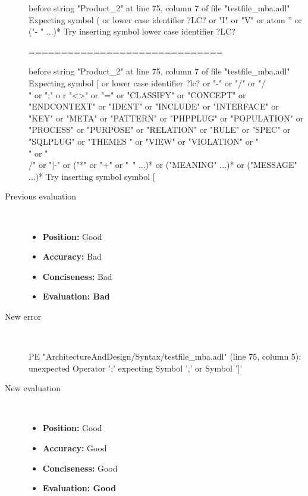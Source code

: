 \begin{description}
\begin{haskell}
before string "Product_2" at line 75, column 7 of file "testfile_mba.adl"
Expecting symbol ( or lower case identifier ?LC? or "I" or "V" or atom '' or ("-
" ...)*
Try inserting symbol lower case identifier ?LC?

==============================

before string "Product_2" at line 75, column 7 of file "testfile_mba.adl"
Expecting symbol [ or lower case identifier ?lc? or "-" or "/" or "/\\" or ";" o
r "<>" or "=" or "CLASSIFY" or "CONCEPT" or "ENDCONTEXT" or "IDENT" or "INCLUDE"
 or "INTERFACE" or "KEY" or "META" or "PATTERN" or "PHPPLUG" or "POPULATION" or
"PROCESS" or "PURPOSE" or "RELATION" or "RULE" or "SPEC" or "SQLPLUG" or "THEMES
" or "VIEW" or "VIOLATION" or "\\" or "\\/" or "|-" or ("*" or "+" or "~" ...)*
or ("MEANING" ...)* or ("MESSAGE" ...)*
Try inserting symbol symbol [
\end{haskell}
  \item[Previous evaluation]~\\
    \begin{itemize}
    \item \textbf{Position:} Good
    \item \textbf{Accuracy:} Bad
    \item \textbf{Conciseness:} Bad
    \item \textbf{Evaluation: Bad}
    \end{itemize}
  \item[New error]~\\
\begin{haskell}
PE "ArchitectureAndDesign/Syntax/testfile_mba.adl" (line 75, column 5):
unexpected Operator ';'
expecting Symbol ',' or Symbol ']'\end{haskell}
  \item[New evaluation]~\\
    \begin{itemize}
    \item \textbf{Position:} Good
    \item \textbf{Accuracy:} Good
    \item \textbf{Conciseness:} Good
    \item \textbf{Evaluation: Good}
    \end{itemize}
  \end{description}

\hrulefill

